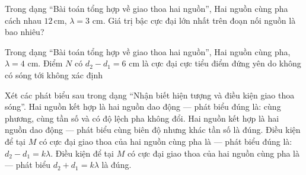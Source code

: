\begin{ex}
Trong dạng “Bài toán tổng hợp về giao thoa hai nguồn”, Hai nguồn cùng pha cách nhau $12\,\text{cm}$, $\lambda=3$ cm. Giá trị bậc cực đại lớn nhất trên đoạn nối nguồn là bao nhiêu?
\end{ex}

\begin{ex}
Trong dạng “Bài toán tổng hợp về giao thoa hai nguồn”, Hai nguồn cùng pha, $\lambda=4$ cm. Điểm $N$ có $d_2-d_1=6$ cm là
\choice
{cực đại}
{\True cực tiểu}
{điểm đứng yên do không có sóng tới}
{không xác định}
\end{ex}

\begin{ex}
Xét các phát biểu sau trong dạng “Nhận biết hiện tượng và điều kiện giao thoa sóng”.
\choiceTF
{\True Hai nguồn kết hợp là hai nguồn dao động — phát biểu đúng là: cùng phương, cùng tần số và có độ lệch pha không đổi.}
{Hai nguồn kết hợp là hai nguồn dao động — phát biểu cùng biên độ nhưng khác tần số là đúng.}
{\True Điều kiện để tại $M$ có cực đại giao thoa của hai nguồn cùng pha là — phát biểu đúng là: $d_2-d_1=k\lambda$.}
{Điều kiện để tại $M$ có cực đại giao thoa của hai nguồn cùng pha là — phát biểu $d_2+d_1=k\lambda$ là đúng.}
\end{ex}

